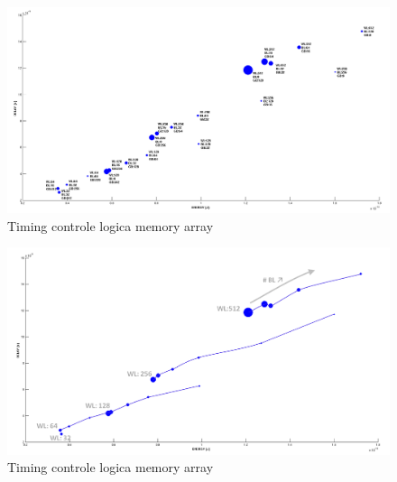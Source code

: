 \begin{figure}[h!]
  \centering
  \includegraphics[scale=0.5, angle = 90]{../fig/hfdstk-timing-all-sol1.png}
  \caption{Timing controle logica memory array}
  \label{fig:final20all1}
\end{figure} 

\begin{figure}[h!]
  \centering
  \includegraphics[scale=0.6]{../fig/hfdstk-timing-all-sol2.png}
  \caption{Timing controle logica memory array}
  \label{fig:final20all2}
\end{figure} 
